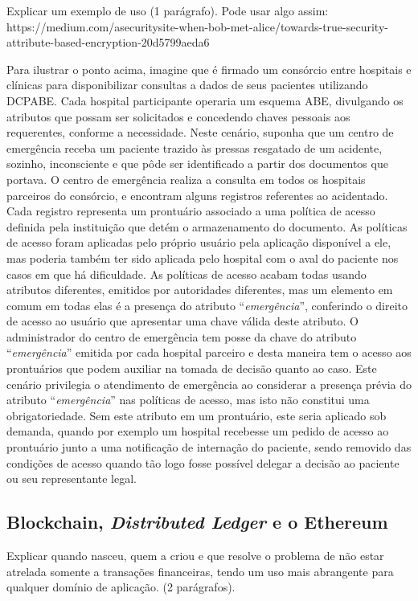 \documentclass[a4paper,11pt]{article}
\begin{document}
{\color{ForestGreen}Explicar um exemplo de uso (1 parágrafo). Pode usar algo assim: https://medium.com/asecuritysite-when-bob-met-alice/towards-true-security-attribute-based-encryption-20d5799aeda6}

Para ilustrar o ponto acima, imagine que é firmado um consórcio entre hospitais e clínicas para disponibilizar consultas a dados de seus pacientes utilizando DCPABE.
Cada hospital participante operaria um esquema ABE, divulgando os atributos que possam ser solicitados e concedendo chaves pessoais aos requerentes, conforme a necessidade.
Neste cenário, suponha que um centro de emergência receba um paciente trazido às pressas resgatado de um acidente, sozinho, inconsciente e que pôde ser identificado a partir dos documentos que portava.
O centro de emergência realiza a consulta em todos os hospitais parceiros do consórcio, e encontram alguns registros referentes ao acidentado.
Cada registro representa um prontuário associado a uma política de acesso definida pela instituição que detém o armazenamento do documento.
As políticas de acesso foram aplicadas pelo próprio usuário pela aplicação disponível a ele, mas poderia também ter sido aplicada pelo hospital com o aval do paciente nos casos em que há dificuldade.
As políticas de acesso acabam todas usando atributos diferentes, emitidos por autoridades diferentes, mas um elemento em comum em todas elas é a presença do atributo ``\emph{emergência}'', conferindo o direito de acesso ao usuário que apresentar uma chave válida deste atributo.
O administrador do centro de emergência tem posse da chave do atributo ``\emph{emergência}'' emitida por cada hospital parceiro e desta maneira tem o acesso aos prontuários que podem auxiliar na tomada de decisão quanto ao caso.
Este cenário privilegia o atendimento de emergência ao considerar a presença prévia do atributo ``\emph{emergência}'' nas políticas de acesso, mas isto não constitui uma obrigatoriedade.
Sem este atributo em um prontuário, este seria aplicado sob demanda, quando por exemplo um hospital recebesse um pedido de acesso ao prontuário junto a uma notificação de internação do paciente, sendo removido das condições de acesso quando tão logo fosse possível delegar a decisão ao paciente ou seu representante legal.

\subsection{Blockchain, \emph{Distributed Ledger} e o Ethereum}

{\color{ForestGreen}Explicar quando nasceu, quem a criou e que resolve o problema de não estar atrelada somente a transações financeiras, tendo um uso mais abrangente para qualquer domínio de aplicação. (2 parágrafos).}
\end{document}
